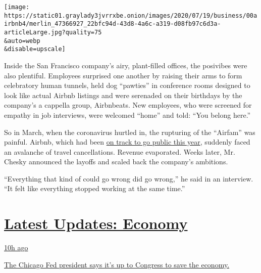 \texttt{[image: https://static01.graylady3jvrrxbe.onion/images/2020/07/19/business/00airbnb4/merlin\_47366927\_22bfc94d-43d8-4a6c-a319-d08fb97c6d3a-articleLarge.jpg?quality=75\\\&auto=webp\\\&disable=upscale]}

Inside the San Francisco company's airy, plant-filled offices, the
posivibes were also plentiful. Employees surprised one another by
raising their arms to form celebratory human tunnels, held dog
``pawties'' in conference rooms designed to look like actual Airbnb
listings and were serenaded on their birthdays by the company's a
cappella group, Airbnbeats. New employees, who were screened for empathy
in job interviews, were welcomed ``home'' and told: ``You belong here.''

So in March, when the coronavirus hurtled in, the rupturing of the
``Airfam'' was painful. Airbnb, which had been
\href{https://www.nytimes3xbfgragh.onion/2019/09/19/technology/airbnb-ipo-2020.html}{on
track to go public this year}, suddenly faced an avalanche of travel
cancellations. Revenue evaporated. Weeks later, Mr. Chesky announced the
layoffs and scaled back the company's ambitions.

``Everything that kind of could go wrong did go wrong,'' he said in an
interview. ``It felt like everything stopped working at the same time.''

\hypertarget{latest-updates-economy}{%
\section{\texorpdfstring{\href{https://www.nytimes3xbfgragh.onion/live/2020/08/03/business/stock-market-today-coronavirus?action=click\&pgtype=Article\&state=default\&region=MAIN_CONTENT_1\&context=storylines_live_updates}{Latest
Updates:
Economy}}{Latest Updates: Economy}}\label{latest-updates-economy}}

\href{https://www.nytimes3xbfgragh.onion/live/2020/08/03/business/stock-market-today-coronavirus?action=click\&pgtype=Article\&state=default\&region=MAIN_CONTENT_1\&context=storylines_live_updates\#the-chicago-fed-president-says-its-up-to-congress-to-save-the-economy}{10h
ago}

\href{https://www.nytimes3xbfgragh.onion/live/2020/08/03/business/stock-market-today-coronavirus?action=click\&pgtype=Article\&state=default\&region=MAIN_CONTENT_1\&context=storylines_live_updates\#the-chicago-fed-president-says-its-up-to-congress-to-save-the-economy}{The
Chicago Fed president says it's up to Congress to save the economy.}

